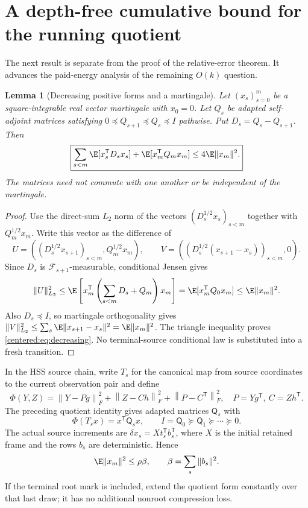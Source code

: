 \documentclass[11pt,oneside,openany,a4paper]{book}
\numberwithin{equation}{chapter}
\newtheorem{lemma}[theorem]{Lemma}
\theoremstyle{definition}
\theoremstyle{remark}
\newcommand{\F}[1]{\left\lVert#1\right\rVert_F}
\begin{document}
\section{A depth-free cumulative bound for the running quotient}\label{centered:sec:dissipation}
The next result is separate from the proof of the relative-error theorem. It advances the paid-energy analysis of the remaining $O(k)$ question.

\begin{lemma}[Decreasing positive forms and a martingale]\label{centered:lem:decreasing}
Let $(x_s)_{s=0}^m$ be a square-integrable real vector martingale with $x_0=0$. Let $Q_s$ be adapted self-adjoint matrices satisfying
$0\preceq Q_{s+1}\preceq Q_s\preceq I$ pathwise. Put $D_s=Q_s-Q_{s+1}$. Then
\begin{equation}\label{centered:eq:decreasing}
 \boxed{\sum_{s<m}\E[x_s^{\mathsf T}D_sx_s]
 +\E[x_m^{\mathsf T}Q_mx_m]\le4\E\|x_m\|^2.}
\end{equation}
The matrices need not commute with one another or be independent of the martingale.
\end{lemma}
\begin{proof}
Use the direct-sum $L_2$ norm of the vectors
$(D_s^{1/2}x_s)_{s<m}$ together with $Q_m^{1/2}x_m$.
Write this vector as the difference of
\[
 U=((D_s^{1/2}x_{s+1})_{s<m},Q_m^{1/2}x_m),\qquad
 V=((D_s^{1/2}(x_{s+1}-x_s))_{s<m},0).
\]
Since $D_s$ is $\mathcal F_{s+1}$-measurable, conditional Jensen gives
\[
 \|U\|_{L_2}^2\le\E\left[x_m^{\mathsf T}\left(\sum_{s<m}D_s+Q_m\right)x_m\right]
 =\E[x_m^{\mathsf T}Q_0x_m]\le\E\|x_m\|^2.
\]
Also $D_s\preceq I$, so martingale orthogonality gives
$\|V\|_{L_2}^2\le\sum_s\E\|x_{s+1}-x_s\|^2=\E\|x_m\|^2$.
The triangle inequality proves \eqref{centered:eq:decreasing}. No terminal-source conditional law is substituted into a fresh transition.
\end{proof}

In the HSS source chain, write $T_s$ for the canonical map from source coordinates to the current observation pair and define
\[
 \Phi(Y,Z)=\F{Y-Pg}^2+\F{Z-Ch}^2+\F{P-C^{\mathsf T}}^2,
 \quad P=Yg^{\mathsf T},\ C=Zh^{\mathsf T}.
\]
The preceding quotient identity gives adapted matrices $\mathsf Q_s$ with
\[
 \Phi(T_sx)=x^{\mathsf T}\mathsf Q_sx,\qquad
 I=\mathsf Q_0\succeq\mathsf Q_1\succeq\cdots\succeq0.
\]
The actual source increments are $\delta x_s=Xt_s^{\mathsf T}b_s^{\mathsf T}$, where $X$ is the initial retained frame and the rows $b_s$ are deterministic. Hence
\[
 \E\|x_m\|^2\le\rho\beta,\qquad \beta=\sum_s\|b_s\|^2.
\]
If the terminal root mark is included, extend the quotient form constantly over that last draw; it has no additional nonroot compression loss.
\end{document}
